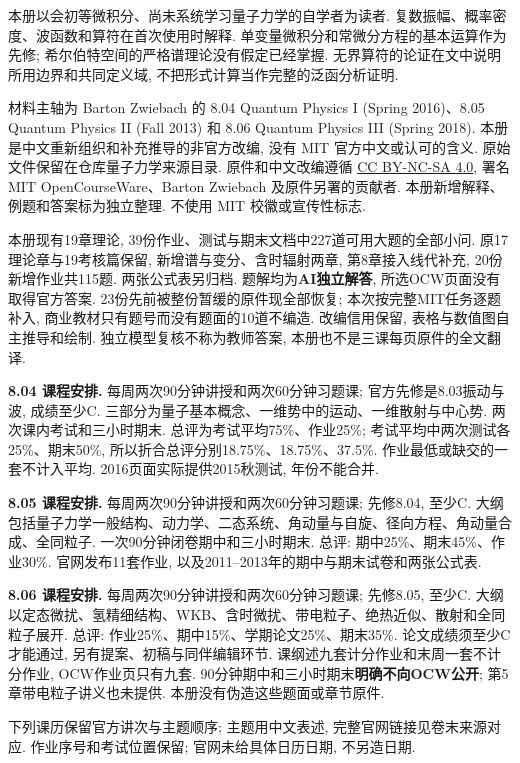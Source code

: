 \originalpreface
本册以会初等微积分、尚未系统学习量子力学的自学者为读者. 复数振幅、概率密度、波函数和算符在首次使用时解释. 单变量微积分和常微分方程的基本运算作为先修; 希尔伯特空间的严格谱理论没有假定已经掌握. 无界算符的论证在文中说明所用边界和共同定义域, 不把形式计算当作完整的泛函分析证明.

材料主轴为 Barton Zwiebach 的 8.04 Quantum Physics I (Spring 2016)、8.05 Quantum Physics II (Fall 2013) 和 8.06 Quantum Physics III (Spring 2018). 本册是中文重新组织和补充推导的非官方改编, 没有 MIT 官方中文或认可的含义. 原始文件保留在仓库量子力学来源目录. 原件和中文改编遵循 \href{https://creativecommons.org/licenses/by-nc-sa/4.0/}{CC BY-NC-SA 4.0}, 署名 MIT OpenCourseWare、Barton Zwiebach 及原件另署的贡献者. 本册新增解释、例题和答案标为独立整理. 不使用 MIT 校徽或宣传性标志.

本册现有19章理论, 39份作业、测试与期末文档中227道可用大题的全部小问. 原17理论章与19考核篇保留, 新增谱与变分、含时辐射两章, 第8章接入线代补充, 20份新增作业共115题. 两张公式表另归档. 题解均为\textbf{AI独立解答}, 所选OCW页面没有取得官方答案. 23份先前被整份暂缓的原件现全部恢复; 本次按完整MIT任务逐题补入, 商业教材只有题号而没有题面的10道不编造. 改编信用保留, 表格与数值图自主推导和绘制. 独立模型复核不称为教师答案, 本册也不是三课每页原件的全文翻译.

\noindent\textbf{8.04 课程安排.}
每周两次90分钟讲授和两次60分钟习题课; 官方先修是8.03振动与波, 成绩至少C. 三部分为量子基本概念、一维势中的运动、一维散射与中心势. 两次课内考试和三小时期末. 总评为考试平均75\%、作业25\%; 考试平均中两次测试各25\%、期末50\%, 所以折合总评分别18.75\%、18.75\%、37.5\%. 作业最低或缺交的一套不计入平均. 2016页面实际提供2015秋测试, 年份不能合并.

\noindent\textbf{8.05 课程安排.}
每周两次90分钟讲授和两次60分钟习题课; 先修8.04, 至少C. 大纲包括量子力学一般结构、动力学、二态系统、角动量与自旋、径向方程、角动量合成、全同粒子. 一次90分钟闭卷期中和三小时期末. 总评: 期中25\%、期末45\%、作业30\%. 官网发布11套作业, 以及2011--2013年的期中与期末试卷和两张公式表.

\noindent\textbf{8.06 课程安排.}
每周两次90分钟讲授和两次60分钟习题课; 先修8.05, 至少C. 大纲以定态微扰、氢精细结构、WKB、含时微扰、带电粒子、绝热近似、散射和全同粒子展开. 总评: 作业25\%、期中15\%、学期论文25\%、期末35\%. 论文成绩须至少C才能通过, 另有提案、初稿与同伴编辑环节. 课纲述九套计分作业和末周一套不计分作业, OCW作业页只有九套. 90分钟期中和三小时期末\textbf{明确不向OCW公开}; 第5章带电粒子讲义也未提供. 本册没有伪造这些题面或章节原件.

下列课历保留官方讲次与主题顺序; 主题用中文表述, 完整官网链接见卷末来源对应. 作业序号和考试位置保留; 官网未给具体日历日期, 不另造日期.

